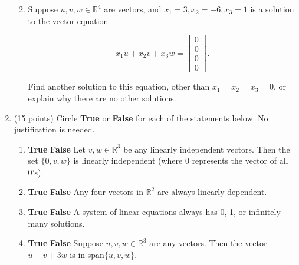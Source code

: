 \documentclass[12 pt]{report}
\begin{document}
\begin{enumerate}
\begin{enumerate}
\vfill 

\item Suppose $u, v, w \in \mathbb{R}^4$ are vectors, and $x_1 = 3, x_2=-6, x_3= 1$ is a solution to the vector equation 

\begin{equation*}
x_1 u + x_2 v + x_3 w = \begin{bmatrix} 0 \\ 0 \\ 0 \\ 0 \end{bmatrix}.
\end{equation*}

Find another solution to this equation, other than $x_1 = x_2 = x_3 = 0$, or explain why there are no other solutions. 
\vfill
\end{enumerate} 

\newpage

\item (15 points) Circle \textbf{True} or \textbf{False} for each of the statements below. No justification is needed. 

\begin{enumerate} \item \textbf{True} \hspace{5pt} \textbf{False} \hspace{5pt} Let $v, w \in \mathbb{R}^3$ be any linearly independent vectors. Then the set $\{0, v, w\}$ is linearly independent (where $0$ represents the vector of all 0's).

\vfill 

\item \textbf{True} \hspace{5pt} \textbf{False} \hspace{5pt} Any four vectors in $\mathbb{R}^2$ are always linearly dependent. 

\vfill 

\item \textbf{True} \hspace{5pt} \textbf{False} \hspace{5pt} A system of linear equations always has 0, 1, or infinitely many solutions. 

\vfill 

\item \textbf{True} \hspace{5pt} \textbf{False} \hspace{5pt} Suppose $u, v, w \in \mathbb{R}^3$ are any vectors. Then the vector $u - v + 3w$ is in span$\{u,v,w\}$. 


\end{enumerate}
\end{enumerate}
\end{document}
